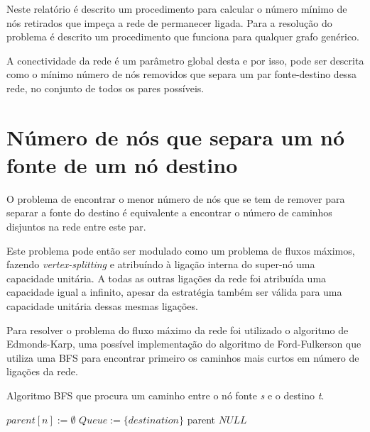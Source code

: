 \documentclass[12pt,a4paper]{article}
\begin{document}
Neste relatório é descrito um procedimento para calcular o número mínimo de nós retirados que impeça a rede de permanecer ligada. Para a resolução do problema é descrito um procedimento que funciona para qualquer grafo genérico.

A conectividade da rede é um parâmetro global desta e por isso, pode ser descrita como o mínimo número de nós removidos que separa um par fonte-destino dessa rede, no conjunto de todos os pares possíveis.

\section{Número de nós que separa um nó fonte de um nó destino}

O problema de encontrar o menor número de nós que se tem de remover para separar a fonte do destino é equivalente a encontrar o número de caminhos disjuntos na rede entre este par.

Este problema pode então ser modulado como um problema de fluxos máximos, fazendo \textit{vertex-splitting} e atribuíndo à ligação interna do super-nó uma capacidade unitária. A todas as outras ligações da rede foi atribuída uma capacidade igual a infinito, apesar da estratégia também ser válida para uma capacidade unitária dessas mesmas ligações.

Para resolver o problema do fluxo máximo da rede foi utilizado o algoritmo de Edmonds-Karp, uma possível implementação do algoritmo de Ford-Fulkerson que utiliza uma BFS para encontrar primeiro os caminhos mais curtos em número de ligações da rede.

\begin{algorithm}
\caption{Algoritmo BFS que procura um caminho entre o nó fonte \textit{s} e o destino \textit{t}.}\label{alg:bfs_goal}
\begin{algorithmic}[1]
    	\State $parent[n] := \emptyset $
    \EndFor
    \State $Queue :=  \{destination\}$
      		\Return parent 
      \EndIf
            \EndIf
      \EndFor
  	\EndWhile
  	\Return $NULL$
\EndProcedure
\end{algorithmic}
\end{algorithm}
\end{document}
